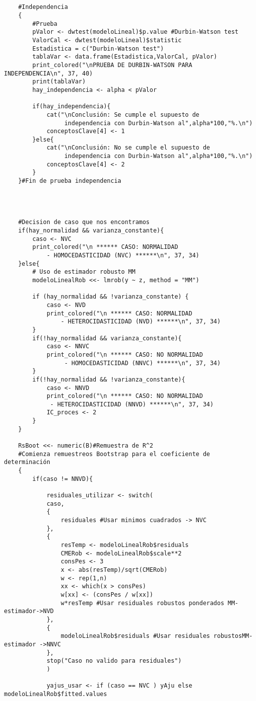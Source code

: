 \begin{verbatim}
	
	
	#Independencia
	{
		#Prueba
		pValor <- dwtest(modeloLineal)$p.value #Durbin-Watson test
		ValorCal <- dwtest(modeloLineal)$statistic
		Estadistica = c("Durbin-Watson test")
		tablaVar <- data.frame(Estadistica,ValorCal, pValor)
		print_colored("\nPRUEBA DE DURBIN-WATSON PARA INDEPENDENCIA\n", 37, 40)
		print(tablaVar)
		hay_independencia <- alpha < pValor
		
		if(hay_independencia){
			cat("\nConclusión: Se cumple el supuesto de
				 independencia con Durbin-Watson al",alpha*100,"%.\n")
			conceptosClave[4] <- 1
		}else{
			cat("\nConclusión: No se cumple el supuesto de
				 independencia con Durbin-Watson al",alpha*100,"%.\n")
			conceptosClave[4] <- 2
		}
	}#Fin de prueba independencia
	
	
	
	
	#Decision de caso que nos encontramos
	if(hay_normalidad && varianza_constante){
		caso <- NVC
		print_colored("\n ****** CASO: NORMALIDAD 
			- HOMOCEDASTICIDAD (NVC) ******\n", 37, 34)
	}else{
		# Uso de estimador robusto MM  
		modeloLinealRob <<- lmrob(y ~ z, method = "MM")
		
		if (hay_normalidad && !varianza_constante) {
			caso <- NVD
			print_colored("\n ****** CASO: NORMALIDAD 
				- HETEROCIDASTICIDAD (NVD) ******\n", 37, 34)
		}
		if(!hay_normalidad && varianza_constante){
			caso <- NNVC
			print_colored("\n ****** CASO: NO NORMALIDAD
				 - HOMOCEDASTICIDAD (NNVC) ******\n", 37, 34)
		}
		if(!hay_normalidad && !varianza_constante){
			caso <- NNVD
			print_colored("\n ****** CASO: NO NORMALIDAD
			 - HETEROCIDASTICIDAD (NNVD) ******\n", 37, 34)
			IC_proces <- 2
		}
	}
	
	RsBoot <<- numeric(B)#Remuestra de R^2
	#Comienza remuestreos Bootstrap para el coeficiente de determinación
	{
		if(caso != NNVD){
			
			residuales_utilizar <- switch(
			caso,
			{
				residuales #Usar minimos cuadrados -> NVC
			},
			{
				resTemp <- modeloLinealRob$residuals 
				CMERob <- modeloLinealRob$scale**2
				consPes <- 3
				x <- abs(resTemp)/sqrt(CMERob)
				w <- rep(1,n)
				xx <- which(x > consPes) 
				w[xx] <- (consPes / w[xx])
				w*resTemp #Usar residuales robustos ponderados MM-estimador->NVD
			},
			{
				modeloLinealRob$residuals #Usar residuales robustosMM-estimador ->NNVC
			},
			stop("Caso no valido para residuales")
			)
			
			yajus_usar <- if (caso == NVC ) yAju else modeloLinealRob$fitted.values
			

\end{verbatim}
